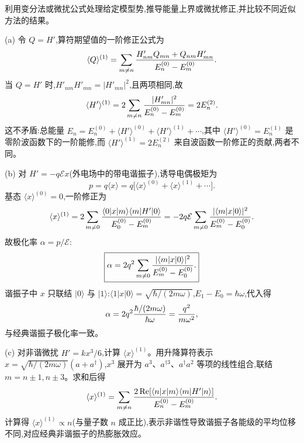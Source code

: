 \begin{question}
利用变分法或微扰公式处理给定模型势,推导能量上界或微扰修正,并比较不同近似方法的结果。
\begin{solution}
(a) 令 $Q=H'$,算符期望值的一阶修正公式为
\[
\langle Q\rangle^{(1)} = \sum_{m\ne n} {H'_{nm} Q_{mn} + Q_{nm} H'_{mn}\over E_n^{(0)}-E_m^{(0)}}.
\]
当 $Q=H'$ 时,$H'_{nm} H'_{mn}=|H'_{mn}|^2$,且两项相同,故
\[
\langle H'\rangle^{(1)} = 2\sum_{m\ne n}{|H'_{mn}|^2\over E_n^{(0)}-E_m^{(0)}} = 2E_n^{(2)}.
\]
这不矛盾:总能量 $E_n = E_n^{(0)} + \langle H'\rangle^{(0)} + \langle H'\rangle^{(1)} + \cdots$,其中 $\langle H'\rangle^{(0)}=E_n^{(1)}$ 是零阶波函数下的一阶能修,而 $\langle H'\rangle^{(1)}=2E_n^{(2)}$ 来自波函数一阶修正的贡献,两者不同。

(b) 对 $H'=-q\mathcal Ex$(外电场中的带电谐振子),诱导电偶极矩为
\[
p = q\langle x\rangle = q\bigl[\langle x\rangle^{(0)} + \langle x\rangle^{(1)} + \cdots\bigr].
\]
基态 $\langle x\rangle^{(0)}=0$,一阶修正为
\[
\langle x\rangle^{(1)} = 2\sum_{m\ne 0} {\langle0|x|m\rangle\langle m|H'|0\rangle\over E_0^{(0)}-E_m^{(0)}}
= -2q\mathcal E\sum_{m\ne0}{|\langle m|x|0\rangle|^2\over E_m^{(0)}-E_0^{(0)}}.
\]
故极化率 $\alpha = p/\mathcal E$:
\[
\boxed{\alpha = 2q^2\sum_{m\ne0}{|\langle m|x|0\rangle|^2\over E_m^{(0)}-E_0^{(0)}}.}
\]
谐振子中 $x$ 只联结 $|0\rangle$ 与 $|1\rangle$:$\langle1|x|0\rangle = \sqrt{\hbar/(2m\omega)}$,$E_1-E_0=\hbar\omega$,代入得
\[
\alpha = 2q^2{\hbar/(2m\omega)\over\hbar\omega} = {q^2\over m\omega^2},
\]
与经典谐振子极化率一致。

(c) 对非谐微扰 $H' = kx^3/6$,计算 $\langle x\rangle^{(1)}$。用升降算符表示 $x=\sqrt{\hbar/(2m\omega)}(a+a^\dagger)$,$x^3$ 展开为 $a^3$、$a^{\dagger3}$、$a^\dagger a^2$ 等项的线性组合,联结 $m=n\pm1,n\pm3$。求和后得
\[
\langle x\rangle^{(1)} = \sum_{m\ne n} {2\,\mathrm{Re}[\langle n|x|m\rangle\langle m|H'|n\rangle]\over E_n^{(0)}-E_m^{(0)}}.
\]
计算得 $\langle x\rangle^{(1)} \propto n$(与量子数 $n$ 成正比),表示非谐性导致谐振子各能级的平均位移不同,对应经典非谐振子的热膨胀效应。
\end{solution}
\end{question}

